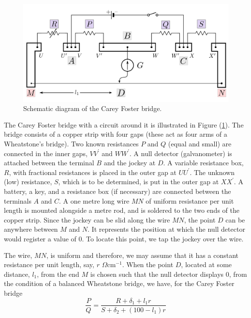 \begin{refsection}
\begin{figure}[!htb]
    \centering
    \includegraphics[width=\textwidth]{figs/carey.png}
    \caption{Schematic diagram of the Carey Foster bridge.}
    \label{fig:carey}
\end{figure}

The Carey Foster bridge with a circuit around it is illustrated in Figure (\ref{fig:carey}).
The bridge consists of a copper strip with four gaps (these act as four arms of a Wheatstone’s bridge). Two known resistances $P$ and $Q$ (equal and small) are connected in the inner gaps, $VV^{\prime}$ and $WW^{\prime}$. A null detector (galvanometer) is attached between the terminal $B$ and the jockey at $D$. A variable resistance box, $R$, with fractional resistances is placed in the outer gap at $UU^{\prime}$. The unknown (low) resistance, $S$, which is to be determined, is put in the 
outer gap at $XX^{\prime}$. A battery, a key, and a resistance box (if necessary) are connected between the terminals $A$ and $C$. A one metre long wire $MN$ of uniform resistance per unit length is mounted alongside a metre rod, and is soldered to the two ends of the copper strip. Since the jockey can be slid along the wire $MN$, the point $D$ can be anywhere between $M$ and $N$. It represents the position at which the null detector would register a value of 0. To locate this point, we tap the jockey over the wire. 

The wire, $MN$, is uniform and therefore, we may assume that it has a constant resistance per unit length, say, $r$ $\Omega$cm$^{-1}$. When the point $D$, located at some distance, $l_1$, from the end $M$ is chosen such that the null detector displays $0$, from the condition of a balanced Wheatstone bridge, we have, for the Carey Foster bridge 
\begin{equation}
\frac{P}{Q}=\frac{R+\delta_{1}+l_{1}r}{S+\delta_{2}+(100-l_{1})r}
\label{careyconfig1}
\end{equation}


\end{refsection}
